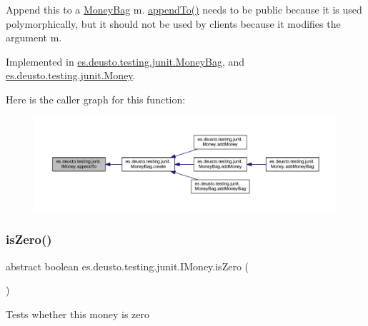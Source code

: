 Append this to a \mbox{\hyperlink{classes_1_1deusto_1_1testing_1_1junit_1_1_money_bag}{Money\+Bag}} m. \mbox{\hyperlink{interfacees_1_1deusto_1_1testing_1_1junit_1_1_i_money_ae45bc758e69a0017f083f11d050c53cb}{append\+To()}} needs to be public because it is used polymorphically, but it should not be used by clients because it modifies the argument m. 

Implemented in \mbox{\hyperlink{classes_1_1deusto_1_1testing_1_1junit_1_1_money_bag_ac8a5877b35b12939ce14543872ed18af}{es.\+deusto.\+testing.\+junit.\+Money\+Bag}}, and \mbox{\hyperlink{classes_1_1deusto_1_1testing_1_1junit_1_1_money_aa9a6df9f35118060914ae6e8f74d1d51}{es.\+deusto.\+testing.\+junit.\+Money}}.

Here is the caller graph for this function\+:
\nopagebreak
\begin{figure}[H]
\begin{center}
\leavevmode
\includegraphics[width=350pt]{interfacees_1_1deusto_1_1testing_1_1junit_1_1_i_money_ae45bc758e69a0017f083f11d050c53cb_icgraph}
\end{center}
\end{figure}
\mbox{\label{interfacees_1_1deusto_1_1testing_1_1junit_1_1_i_money_a166c39b6f931e49769580a04f8c73500}} 
\subsubsection{\texorpdfstring{is\+Zero()}{isZero()}}
{\footnotesize\ttfamily abstract boolean es.\+deusto.\+testing.\+junit.\+I\+Money.\+is\+Zero (\begin{DoxyParamCaption}{ }\end{DoxyParamCaption})\hspace{0.3cm}{\ttfamily [abstract]}}

Tests whether this money is zero 

